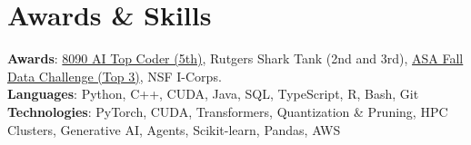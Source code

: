\documentclass[letterpaper,11pt]{article}
\begin{document}
\section{Awards \& Skills}
 \begin{itemize}[leftmargin=0.15in, label={}]
    \small{\item{
     \textbf{Awards}{: \href{https://github.com/AkeBoss-tech/top-coder-challenge}{8090 AI Top Coder (5th)}, Rutgers Shark Tank (2nd and 3rd), \href{https://acashmoney.biz/portfolio/asa-fall-data/}{ASA Fall Data Challenge (Top 3)}, NSF I-Corps.} \\
     \textbf{Languages}{: Python, C++, CUDA, Java, SQL, TypeScript, R, Bash, Git} \\
     \textbf{Technologies}{: PyTorch, CUDA, Transformers, Quantization \& Pruning, HPC Clusters, Generative AI, Agents, Scikit-learn, Pandas, AWS}
    }}
 \end{itemize}
\end{document}
